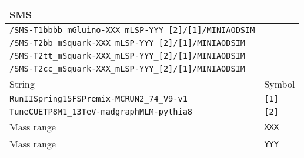 \begin{center}
\begin{tabular}{ll}
\hline
\hline
SMS & \tabularnewline
\hline
\verb!/SMS-T1bbbb_mGluino-XXX_mLSP-YYY_[2]/[1]/MINIAODSIM! & \tabularnewline
\verb!/SMS-T2bb_mSquark-XXX_mLSP-YYY_[2]/[1]/MINIAODSIM! & \tabularnewline
\verb!/SMS-T2tt_mSquark-XXX_mLSP-YYY_[2]/[1]/MINIAODSIM! & \tabularnewline
\verb!/SMS-T2cc_mSquark-XXX_mLSP-YYY_[2]/[1]/MINIAODSIM! & \tabularnewline
\hline
String & Symbol \tabularnewline
\verb!RunIISpring15FSPremix-MCRUN2_74_V9-v1! & \verb![1]! \tabularnewline
\verb!TuneCUETP8M1_13TeV-madgraphMLM-pythia8! & \verb![2]! \tabularnewline
Mass range & \verb!XXX! \tabularnewline
Mass range & \verb!YYY! \tabularnewline
\hline
\hline
\end{tabular}
\end{center}
